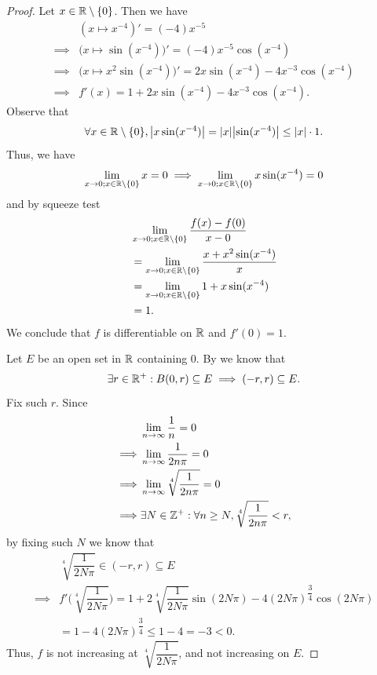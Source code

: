 \begin{proof}
  Let \(x \in \mathbb{R} \setminus \left\lbrace0\right\rbrace\).
  Then we have
  \begin{align*}
             & (x \mapsto x^{-4})' = (-4) x^{-5}                                               \\
    \implies & \big(x \mapsto \sin(x^{-4})\big)' = (-4) x^{-5} \cos(x^{-4})                    \\
    \implies & \big(x \mapsto x^2 \sin(x^{-4})\big)' = 2x \sin(x^{-4}) - 4 x^{-3} \cos(x^{-4}) \\
    \implies & f'(x) = 1 + 2 x \sin(x^{-4}) - 4 x^{-3} \cos(x^{-4}).
  \end{align*}
  Observe that
  \[
    \forall x \in \R \setminus \set{0}, \abs{x \sin(x^{-4})} = \abs{x} \abs{\sin(x^{-4})} \leq \abs{x} \cdot 1.
  \]
  Thus, we have
  \[
    \lim_{x \to 0 ; x \in \mathbb{R} \setminus \left\lbrace0\right\rbrace} x = 0 \implies \lim_{x \to 0 ; x \in \mathbb{R} \setminus \left\lbrace0\right\rbrace} x \sin(x^{-4}) = 0
  \]
  and by squeeze test
  \begin{align*}
     & \lim_{x \to 0 ; x \in \mathbb{R} \setminus \left\lbrace0\right\rbrace} \dfrac{f(x) - f(0)}{x - 0}        \\
     & = \lim_{x \to 0 ; x \in \mathbb{R} \setminus \left\lbrace0\right\rbrace} \dfrac{x + x^2 \sin(x^{-4})}{x} \\
     & = \lim_{x \to 0 ; x \in \mathbb{R} \setminus \left\lbrace0\right\rbrace} 1 + x \sin(x^{-4})              \\
     & = 1.
  \end{align*}
  We conclude that \(f\) is differentiable on \(\mathbb{R}\) and \(f'(0) = 1\).

  Let \(E\) be an open set in \(\mathbb{R}\) containing \(0\).
  By  we know that
  \[
    \exists r \in \mathbb{R}^+ : B(0, r) \subseteq E \implies (-r, r) \subseteq E.
  \]
  Fix such \(r\).
  Since
  \begin{align*}
             & \lim_{n \to \infty} \dfrac{1}{n} = 0                                     \\
    \implies & \lim_{n \to \infty} \dfrac{1}{2 n \pi} = 0                               \\
    \implies & \lim_{n \to \infty} \sqrt[4]{\dfrac{1}{2 n \pi}} = 0                     \\
    \implies & \exists N \in \mathbb{Z}^+ : \forall n \geq N, \sqrt[4]{\dfrac{1}{2 n \pi}} < r,
  \end{align*}
  by fixing such \(N\) we know that
  \begin{align*}
             & \sqrt[4]{\dfrac{1}{2 N \pi}} \in (-r, r) \subseteq E                                                                                     \\
    \implies & f'\bigg(\sqrt[4]{\dfrac{1}{2 N \pi}}\bigg) = 1 + 2 \sqrt[4]{\dfrac{1}{2 N \pi}} \sin(2 N \pi) - 4 (2 N \pi)^{\dfrac{3}{4}} \cos(2 N \pi) \\
             & = 1 - 4 (2 N \pi)^{\dfrac{3}{4}} \leq 1 - 4 = -3 < 0.
  \end{align*}
  Thus, \(f\) is not increasing at \(\sqrt[4]{\dfrac{1}{2 N \pi}}\), and not increasing on \(E\).
\end{proof}

